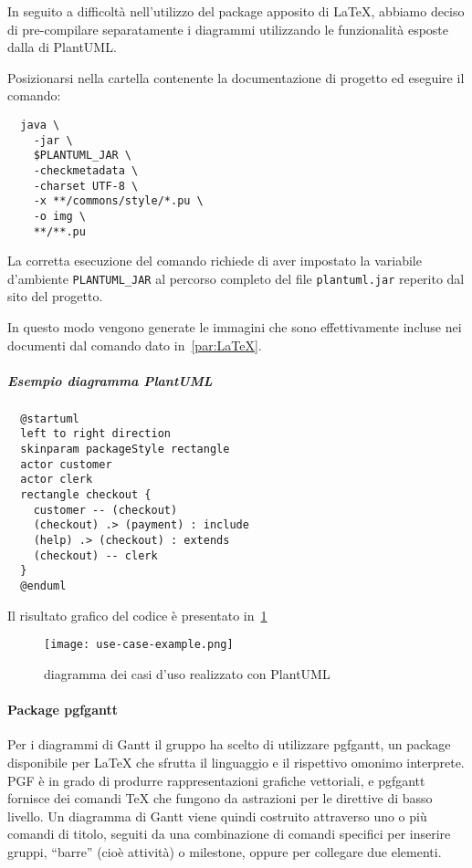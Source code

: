\documentclass[../../norme-di-progetto.tex]{subfiles}
\begin{document}
\begin{description}
In seguito a difficoltà nell'utilizzo del package apposito di \LaTeX{}, abbiamo deciso di pre-compilare separatamente i diagrammi utilizzando le funzionalità esposte dalla  di PlantUML\@.

Posizionarsi nella cartella contenente la documentazione di progetto ed eseguire il comando:

\begin{verbatim}
  java \
    -jar \
    $PLANTUML_JAR \
    -checkmetadata \
    -charset UTF-8 \
    -x **/commons/style/*.pu \
    -o img \
    **/**.pu
\end{verbatim}

La corretta esecuzione del comando richiede di aver impostato la variabile d'ambiente \verb|PLANTUML_JAR| al percorso completo del file \verb|plantuml.jar| reperito dal sito del progetto.

In questo modo vengono generate le immagini che sono effettivamente incluse nei documenti dal comando dato in~\ref{par:LaTeX}.

\subparagraph{Esempio diagramma PlantUML}%
\label{subp:esempio_diagramma_plantuml}

\begin{verbatim}
  @startuml
  left to right direction
  skinparam packageStyle rectangle
  actor customer
  actor clerk
  rectangle checkout {
    customer -- (checkout)
    (checkout) .> (payment) : include
    (help) .> (checkout) : extends
    (checkout) -- clerk
  }
  @enduml
\end{verbatim}

Il risultato grafico del codice è presentato in~\ref{fig:esempio_caso_duso}

\begin{figure}[H]%
  \label{fig:esempio_caso_duso}
  \texttt{[image: use-case-example.png]}
  \centering
  \caption{diagramma dei casi d'uso realizzato con PlantUML}
\end{figure}


\paragraph{Package pgfgantt}%
\label{par:pgfgantt}

Per i diagrammi di Gantt il gruppo ha scelto di utilizzare pgfgantt, un package disponibile per \LaTeX{} che sfrutta il linguaggio  e il rispettivo omonimo interprete.
PGF è in grado di produrre rappresentazioni grafiche vettoriali, e pgfgantt fornisce dei comandi \TeX{} che fungono da astrazioni per le direttive di basso livello.
Un diagramma di Gantt viene quindi costruito attraverso uno o più comandi di titolo, seguiti da una combinazione di comandi specifici per inserire gruppi, ``barre'' (cioè attività) o milestone, oppure per collegare due elementi.


\end{description}
\end{document}
